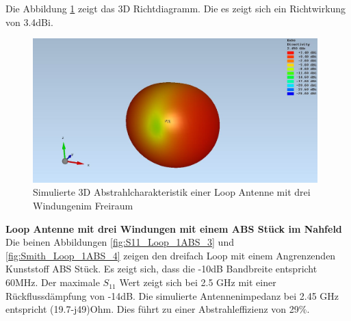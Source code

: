 Die Abbildung \ref{fig:sim_Loop_3Fach_freiraum_3D} zeigt das 3D Richtdiagramm. Die es zeigt sich ein Richtwirkung von 3.4dBi.
\begin{figure}[h]
	\centering
	\includegraphics[width=11cm]{content/bilder/Evaluation/Loop/ohneABS/EM_Far_Field_Loop_Coil_ohneABS.JPG}%
	\caption{Simulierte 3D Abstrahlcharakteristik einer Loop Antenne mit  drei Windungenim Freiraum}
	\label{fig:sim_Loop_3Fach_freiraum_3D}
\end{figure}



\newpage
\textbf{Loop Antenne mit drei Windungen mit einem ABS Stück im Nahfeld}\\
Die beinen Abbildungen \ref{fig:S11_Loop_1ABS_3} und \ref{fig:Smith_Loop_1ABS_4} zeigen den dreifach Loop mit einem Angrenzenden Kunststoff ABS Stück. Es zeigt sich, dass die -10dB Bandbreite entspricht 60MHz. Der maximale $S_{11}$ Wert zeigt sich bei 2.5 GHz mit einer Rückflussdämpfung von -14dB. Die simulierte Antennenimpedanz bei 2.45 GHz entspricht (19.7-j49)Ohm. Dies führt zu einer Abstrahleffizienz von 29$\%$.

